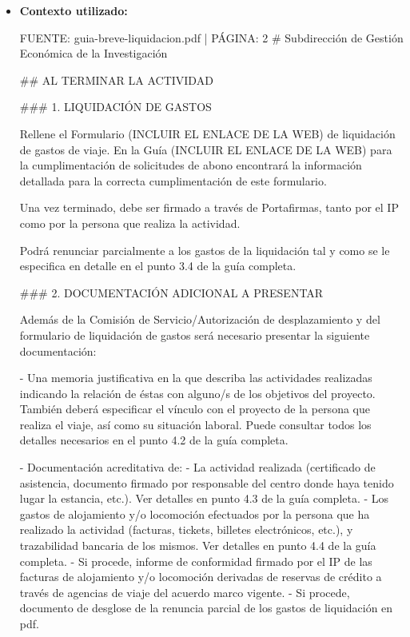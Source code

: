 \documentclass{article}
\begin{document}
\begin{itemize}
\begin{itemize}
                Recuerde que es importante seguir las instrucciones de la \textbf{Guía completa de liquidación de viajes} y adjuntar toda la documentación necesaria para evitar retrasos en el trámite.
          \item \textbf{Contexto utilizado:}
                \begin{scriptsize}
                  FUENTE: guia-breve-liquidacion.pdf | PÁGINA: 2
                  \# Subdirección de Gestión Económica de la Investigación

                  \#\# AL TERMINAR LA ACTIVIDAD

                  \#\#\# 1. LIQUIDACIÓN DE GASTOS

                  Rellene el Formulario (INCLUIR EL ENLACE DE LA WEB) de liquidación de gastos de viaje. En la Guía (INCLUIR EL ENLACE DE LA WEB) para la cumplimentación de solicitudes de abono encontrará la información detallada para la correcta cumplimentación de este formulario.

                  Una vez terminado, debe ser firmado a través de Portafirmas, tanto por el IP como por la persona que realiza la actividad.

                  Podrá renunciar parcialmente a los gastos de la liquidación tal y como se le especifica en detalle en el punto 3.4 de la guía completa.

                  \#\#\# 2. DOCUMENTACIÓN ADICIONAL A PRESENTAR

                  Además de la Comisión de Servicio/Autorización de desplazamiento y del formulario de liquidación de gastos será necesario presentar la siguiente documentación:

                  - Una memoria justificativa en la que describa las actividades realizadas indicando la relación de éstas con alguno/s de los objetivos del proyecto. También deberá especificar el vínculo con el proyecto de la persona que realiza el viaje, así como su situación laboral. Puede consultar todos los detalles necesarios en el punto 4.2 de la guía completa.

                  - Documentación acreditativa de:
                  - La actividad realizada (certificado de asistencia, documento firmado por responsable del centro donde haya tenido lugar la estancia, etc.). Ver detalles en punto 4.3 de la guía completa.
                  - Los gastos de alojamiento y/o locomoción efectuados por la persona que ha realizado la actividad (facturas, tickets, billetes electrónicos, etc.), y trazabilidad bancaria de los mismos. Ver detalles en punto 4.4 de la guía completa.
                  - Si procede, informe de conformidad firmado por el IP de las facturas de alojamiento y/o locomoción derivadas de reservas de crédito a través de agencias de viaje del acuerdo marco vigente.
                  - Si procede, documento de desglose de la renuncia parcial de los gastos de liquidación en pdf.


\end{scriptsize}
\end{itemize}
\end{itemize}
\end{document}
